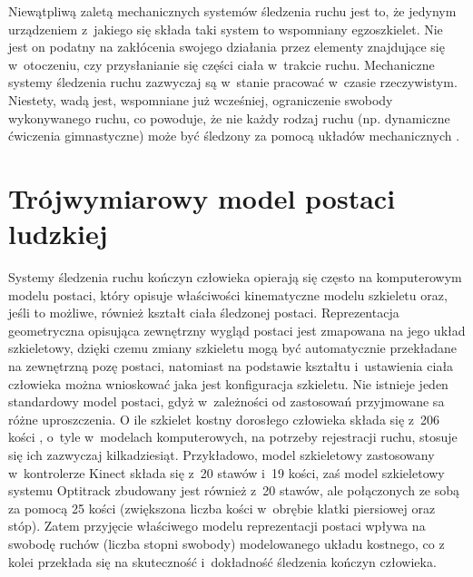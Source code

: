 Niewątpliwą zaletą mechanicznych systemów śledzenia ruchu jest to, że jedynym urządzeniem z~jakiego się składa taki system to wspomniany egzoszkielet. Nie jest on podatny na zakłócenia swojego działania przez elementy znajdujące się w~otoczeniu, czy przysłanianie się części ciała w~trakcie ruchu. Mechaniczne systemy śledzenia ruchu zazwyczaj są w~stanie pracować w~czasie rzeczywistym. Niestety, wadą jest, wspomniane już wcześniej, ograniczenie swobody wykonywanego ruchu, co powoduje, że nie każdy rodzaj ruchu (np. dynamiczne ćwiczenia gimnastyczne) może być śledzony za pomocą układów mechanicznych .
											
\section{Trójwymiarowy model postaci ludzkiej} \label{chap:bodyRep}
Systemy śledzenia ruchu kończyn człowieka opierają się często na komputerowym modelu postaci, który opisuje właściwości kinematyczne modelu szkieletu oraz, jeśli to możliwe, również kształt ciała śledzonej postaci. Reprezentacja geometryczna opisująca zewnętrzny wygląd postaci jest zmapowana na jego układ szkieletowy, dzięki czemu zmiany szkieletu mogą być automatycznie przekładane na zewnętrzną pozę postaci, natomiast na podstawie kształtu i~ustawienia ciała człowieka można wnioskować jaka jest konfiguracja szkieletu. 
Nie istnieje jeden standardowy model postaci, gdyż w~zależności od zastosowań przyjmowane sa różne uproszczenia. O ile szkielet kostny dorosłego człowieka składa się z~206 kości \cite{Lasinski1990}, o~tyle w~modelach komputerowych, na potrzeby rejestracji ruchu, stosuje się ich zazwyczaj kilkadziesiąt. Przykładowo, model szkieletowy zastosowany w~kontrolerze Kinect składa się z~20 stawów i~19 kości, zaś model szkieletowy systemu Optitrack zbudowany jest również z~20 stawów, ale połączonych ze sobą za pomocą 25 kości (zwiększona liczba kości w~obrębie klatki piersiowej oraz stóp). Zatem przyjęcie właściwego modelu reprezentacji postaci wpływa na swobodę ruchów (liczba stopni swobody) modelowanego układu kostnego, co z kolei przekłada się na skuteczność i~dokładność śledzenia kończyn człowieka.
											
